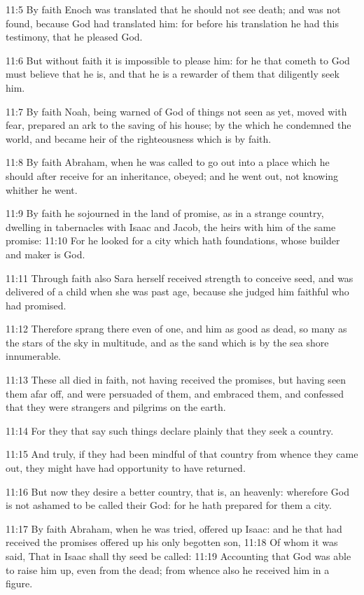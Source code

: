 11:5 By faith Enoch was translated that he should not see death; and
was not found, because God had translated him: for before his
translation he had this testimony, that he pleased God.

11:6 But without faith it is impossible to please him: for he that
cometh to God must believe that he is, and that he is a rewarder of
them that diligently seek him.

11:7 By faith Noah, being warned of God of things not seen as yet,
moved with fear, prepared an ark to the saving of his house; by the
which he condemned the world, and became heir of the righteousness
which is by faith.

11:8 By faith Abraham, when he was called to go out into a place which
he should after receive for an inheritance, obeyed; and he went out,
not knowing whither he went.

11:9 By faith he sojourned in the land of promise, as in a strange
country, dwelling in tabernacles with Isaac and Jacob, the heirs with
him of the same promise: 11:10 For he looked for a city which hath
foundations, whose builder and maker is God.

11:11 Through faith also Sara herself received strength to conceive
seed, and was delivered of a child when she was past age, because she
judged him faithful who had promised.

11:12 Therefore sprang there even of one, and him as good as dead, so
many as the stars of the sky in multitude, and as the sand which is by
the sea shore innumerable.

11:13 These all died in faith, not having received the promises, but
having seen them afar off, and were persuaded of them, and embraced
them, and confessed that they were strangers and pilgrims on the
earth.

11:14 For they that say such things declare plainly that they seek a
country.

11:15 And truly, if they had been mindful of that country from whence
they came out, they might have had opportunity to have returned.

11:16 But now they desire a better country, that is, an heavenly:
wherefore God is not ashamed to be called their God: for he hath
prepared for them a city.

11:17 By faith Abraham, when he was tried, offered up Isaac: and he
that had received the promises offered up his only begotten son, 11:18
Of whom it was said, That in Isaac shall thy seed be called: 11:19
Accounting that God was able to raise him up, even from the dead; from
whence also he received him in a figure.

